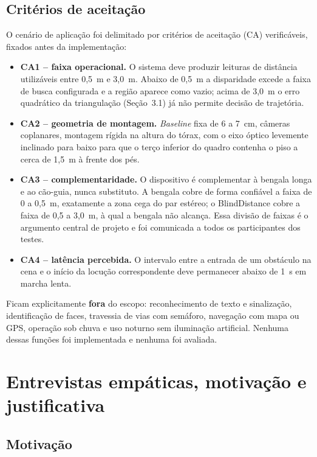 \documentclass[12pt]{article}
\begin{document}
\subsection{Critérios de aceitação}

O cenário de aplicação foi delimitado por critérios de aceitação (CA)
verificáveis, fixados antes da implementação:

\begin{itemize}
\item \textbf{CA1 -- faixa operacional.} O sistema deve produzir leituras de
distância utilizáveis entre 0,5~m e 3,0~m. Abaixo de 0,5~m a disparidade
excede a faixa de busca configurada e a região aparece como vazio; acima de
3,0~m o erro quadrático da triangulação (Seção~3.1) já não permite decisão
de trajetória.
\item \textbf{CA2 -- geometria de montagem.} \textit{Baseline} fixa de 6 a
7~cm, câmeras coplanares, montagem rígida na altura do tórax, com o eixo
óptico levemente inclinado para baixo para que o terço inferior do quadro
contenha o piso a cerca de 1,5~m à frente dos pés.
\item \textbf{CA3 -- complementaridade.} O dispositivo é complementar à bengala
longa e ao cão-guia, nunca substituto. A bengala cobre de forma confiável a
faixa de 0 a 0,5~m, exatamente a zona cega do par estéreo; o BlindDistance
cobre a faixa de 0,5 a 3,0~m, à qual a bengala não alcança. Essa divisão de
faixas é o argumento central de projeto e foi comunicada a todos os
participantes dos testes.
\item \textbf{CA4 -- latência percebida.} O intervalo entre a entrada de um
obstáculo na cena e o início da locução correspondente deve permanecer abaixo
de 1~s em marcha lenta.
\end{itemize}

Ficam explicitamente \textbf{fora} do escopo: reconhecimento de texto e
sinalização, identificação de faces, travessia de vias com semáforo,
navegação com mapa ou GPS, operação sob chuva e uso noturno sem iluminação
artificial. Nenhuma dessas funções foi implementada e nenhuma foi avaliada.

\section{Entrevistas empáticas, motivação e justificativa}

\subsection{Motivação}
\end{document}
